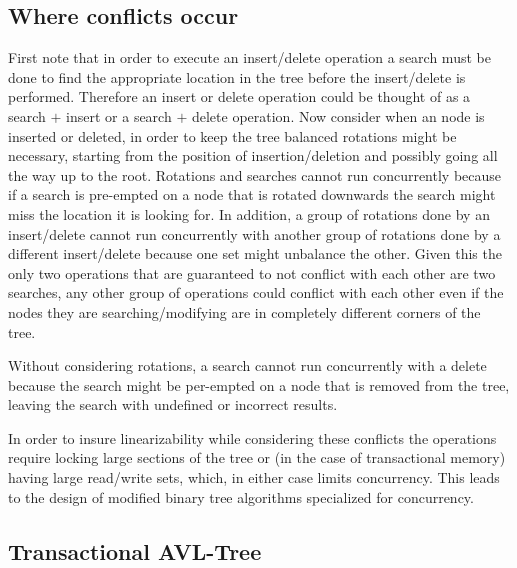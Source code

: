 \documentclass[10pt]{sigplanconf}
\begin{document}
\subsection*{Where conflicts occur}
First note that in order to execute an insert/delete operation a search must be done to find the appropriate location in the tree before the insert/delete is performed.
Therefore an insert or delete operation could be thought of as a search $+$ insert or a search $+$ delete operation.
Now consider when an node is inserted or deleted, in order to keep the tree balanced rotations might be necessary, starting from the position of insertion/deletion and possibly going all the way up to the root.
Rotations and searches cannot run concurrently because if a search is pre-empted on a node that is rotated downwards the search might miss the location it is looking for.
In addition, a group of rotations done by an insert/delete cannot run concurrently with another group of rotations done by a different insert/delete because one set might unbalance the other.
Given this the only two operations that are guaranteed to not conflict with each other are two searches, any other group of operations could conflict with each other even if the nodes they are searching/modifying
are in completely different corners of the tree.

Without considering rotations, a search cannot run concurrently with a delete because the search might be per-empted on a node that is removed from the tree, leaving the search with undefined or incorrect results.

In order to insure linearizability while considering these conflicts the operations require locking large sections of the tree or (in the case of transactional memory) having large read/write sets, which, in either case limits concurrency.
This leads to the design of modified binary tree algorithms specialized for concurrency.

\subsection*{Transactional AVL-Tree}
\end{document}
